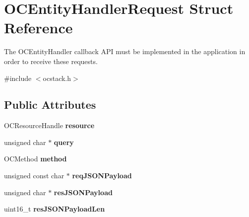 \hypertarget{structOCEntityHandlerRequest}{}\section{O\+C\+Entity\+Handler\+Request Struct Reference}
\label{structOCEntityHandlerRequest}


The O\+C\+Entity\+Handler callback A\+P\+I must be implemented in the application in order to receive these requests.  




{\ttfamily \#include $<$ocstack.\+h$>$}

\subsection*{Public Attributes}
\begin{DoxyCompactItemize}
\item 
\hypertarget{structOCEntityHandlerRequest_abf4e21b81325371446fc248f506f35f5}{}O\+C\+Resource\+Handle {\bfseries resource}\label{structOCEntityHandlerRequest_abf4e21b81325371446fc248f506f35f5}

\item 
\hypertarget{structOCEntityHandlerRequest_a966c2fd243671760bb918911db36b05e}{}unsigned char $\ast$ {\bfseries query}\label{structOCEntityHandlerRequest_a966c2fd243671760bb918911db36b05e}

\item 
\hypertarget{structOCEntityHandlerRequest_a1d2ff6d9f125ed7ef6c6db64d939f601}{}O\+C\+Method {\bfseries method}\label{structOCEntityHandlerRequest_a1d2ff6d9f125ed7ef6c6db64d939f601}

\item 
\hypertarget{structOCEntityHandlerRequest_a67f5f8e7ac44c4fd89c3b45d1e8a583b}{}unsigned const char $\ast$ {\bfseries req\+J\+S\+O\+N\+Payload}\label{structOCEntityHandlerRequest_a67f5f8e7ac44c4fd89c3b45d1e8a583b}

\item 
\hypertarget{structOCEntityHandlerRequest_a568bf6be5ad919ff1ef6fb90988ff34f}{}unsigned char $\ast$ {\bfseries res\+J\+S\+O\+N\+Payload}\label{structOCEntityHandlerRequest_a568bf6be5ad919ff1ef6fb90988ff34f}

\item 
\hypertarget{structOCEntityHandlerRequest_a491cd26225419fe6494f11be0917236c}{}uint16\+\_\+t {\bfseries res\+J\+S\+O\+N\+Payload\+Len}\label{structOCEntityHandlerRequest_a491cd26225419fe6494f11be0917236c}

\end{DoxyCompactItemize}



